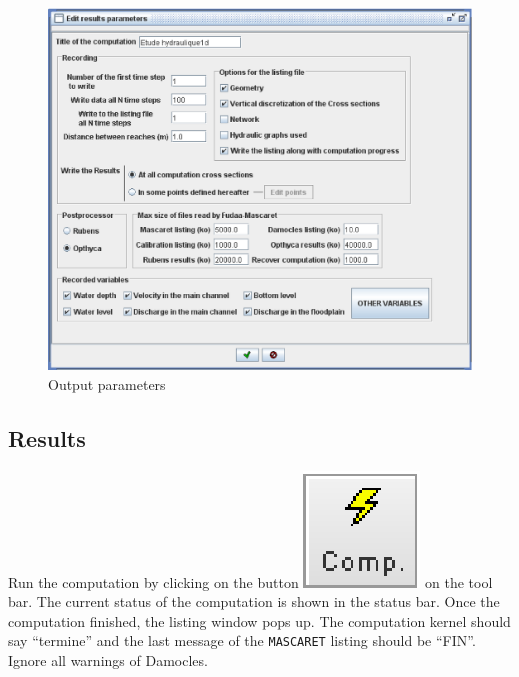 \documentclass[a4paper,12pt]{article}
\begin{document}
\begin{figure}[h]
  \begin{center}
  \includegraphics[scale=0.5]{result_params}
  \caption{Output parameters}
  \label{fig:Output-malpasset}
  \end{center}
\end{figure}



\subsection{Results}

\hspace{0.5cm}Run the computation by clicking on the button \includegraphics[scale=0.6]{compute}
on the tool bar. The current status of the computation is shown in
the status bar. Once the computation finished, the listing window
pops up. The computation kernel should say {}``termine'' and the
last message of the \texttt{MASCARET} listing should be {}``FIN''. Ignore
all warnings of Damocles.

\vspace{0.5cm}
\end{document}
